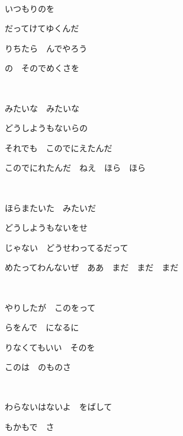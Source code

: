 \documentclass[12pt,a4paper]{article}
\begin{document}
~

いつもりのを

だってけてゆくんだ

りちたら　んでやろう

の　そのでめくさを

~

みたいな　みたいな

どうしようもないらの

それでも　このでにえたんだ

このでにれたんだ　ねえ　ほら　ほら

~

ほらまたいた　みたいだ

どうしようもないをせ

じゃない　どうせわってるだって

めたってわんないぜ　ああ　まだ　まだ　まだ

~

やりしたが　このをって

らをんで　になるに

りなくてもいい　そのを

このは　のものさ

~

わらないはないよ　をばして

もかもで　さ
\end{document}
